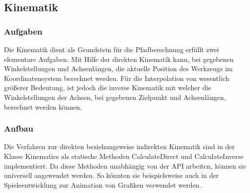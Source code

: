 
\subsection{Kinematik}

\subsubsection{Aufgaben}
Die Kinematik dient als Grundstein für die Pfadberechnung erfüllt zwei elementare Aufgaben. Mit Hilfe der direkten Kinematik kann, bei gegebenen Winkelstellungen und Achsenlängen, die aktuelle Position des Werkzeugs im Koordinatensystem berechnet werden. Für die Interpolation von wesentlich größerer Bedeutung, ist jedoch die inverse Kinematik mit welcher die Winkelstellungen der Achsen, bei gegebenen Zielpunkt und Achsenlängen, berechnet werden können.

\subsubsection{Aufbau}
Die Verfahren zur direkten beziehungsweise indirekten Kinematik sind in der Klasse Kinematics als statische Methoden CalculateDirect und CalculateInverse implementiert. Da diese Methoden unabhängig von der API arbeiten, können sie universell angewendet werden. So könnten sie beispielsweise auch in der Spieleentwicklung zur Animation von Grafiken verwendet werden.

